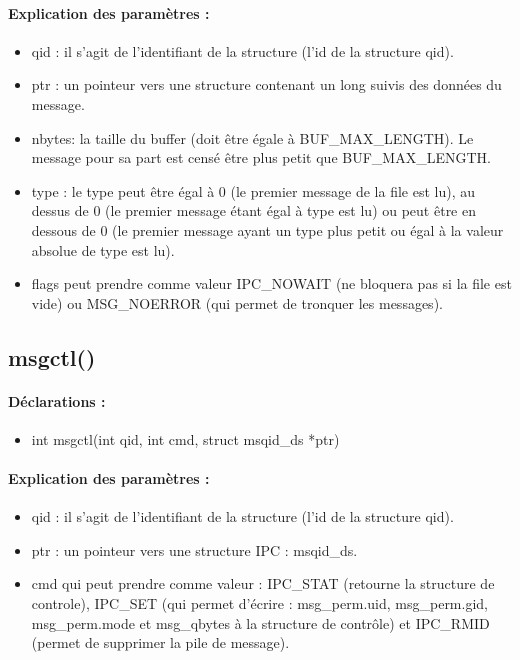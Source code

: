 \documentclass{article}[12pt]
\begin{document}
\paragraph{Explication des paramètres : }
\begin{itemize}
\item qid : il s'agit de l'identifiant de la structure (l'id de la structure qid). 
\item ptr : un pointeur vers une structure contenant un long suivis des données du message.
\item nbytes: la taille du buffer (doit être égale à BUF\_MAX\_LENGTH). Le message pour sa part est censé être plus petit que BUF\_MAX\_LENGTH.
\item type : le type peut être égal à 0 (le premier message de la file est lu), au dessus de 0 (le premier message étant égal à type est lu) ou peut être en dessous de 0 (le premier message ayant un type plus petit ou égal à la valeur absolue de type est lu).
\item flags peut prendre comme valeur IPC\_NOWAIT (ne bloquera pas si la file est vide) ou MSG\_NOERROR (qui permet de tronquer les messages).
\end{itemize}
\subsection{msgctl()}
\paragraph{Déclarations : }
\begin{itemize}
	\item int msgctl(int qid, int cmd, struct msqid\_ds *ptr)  
\end{itemize}
\paragraph{Explication des paramètres : }
\begin{itemize}
\item qid : il s'agit de l'identifiant de la structure (l'id de la structure qid). 
\item ptr : un pointeur vers une structure IPC :  msqid\_ds.
\item cmd qui peut prendre comme valeur : IPC\_STAT (retourne la structure de controle), IPC\_SET (qui permet d'écrire : msg\_perm.uid, msg\_perm.gid, msg\_perm.mode et msg\_qbytes à la structure de contrôle) et IPC\_RMID (permet de supprimer la pile de message). 
\end{itemize}
\end{document}
